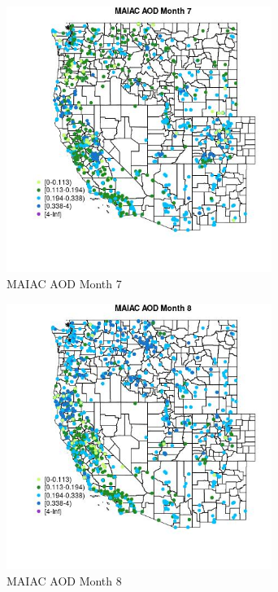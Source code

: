 \begin{figure} 
\centering  
\includegraphics[width=0.77\textwidth]{Code_Outputs/Report_ML_input_PM25_Step4_part_f_de_duplicated_aves_prioritize_24hr_obswNAs_MapObsMo7MAIAC_AOD.jpg} 
\caption{\label{fig:Report_ML_input_PM25_Step4_part_f_de_duplicated_aves_prioritize_24hr_obswNAsMapObsMo7MAIAC_AOD}MAIAC AOD Month 7} 
\end{figure} 
 

\begin{figure} 
\centering  
\includegraphics[width=0.77\textwidth]{Code_Outputs/Report_ML_input_PM25_Step4_part_f_de_duplicated_aves_prioritize_24hr_obswNAs_MapObsMo8MAIAC_AOD.jpg} 
\caption{\label{fig:Report_ML_input_PM25_Step4_part_f_de_duplicated_aves_prioritize_24hr_obswNAsMapObsMo8MAIAC_AOD}MAIAC AOD Month 8} 
\end{figure} 
 

